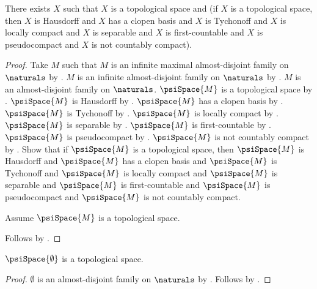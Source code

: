 \begin{theorem}\label{isbell_mrowka_example_exists}
    There exists $X$ such that $X$ is a topological space and
        (if $X$ is a topological space, then
            $X$ is Hausdorff and $X$ has a clopen basis and
            $X$ is Tychonoff and
            $X$ is locally compact and $X$ is separable and
            $X$ is first-countable and $X$ is pseudocompact and
            $X$ is not countably compact).
\end{theorem}
\begin{proof}
    Take $M$ such that
        $M$ is an infinite maximal almost-disjoint family on $\naturals$ by
        .
    $M$ is an infinite almost-disjoint family on $\naturals$ by
        .
    $M$ is an almost-disjoint family on $\naturals$.
    $\psiSpace{M}$ is a topological space by
        .
    $\psiSpace{M}$ is Hausdorff by .
    $\psiSpace{M}$ has a clopen basis by
        .
    $\psiSpace{M}$ is Tychonoff by .
    $\psiSpace{M}$ is locally compact by
        .
    $\psiSpace{M}$ is separable by .
    $\psiSpace{M}$ is first-countable by
        .
    $\psiSpace{M}$ is pseudocompact by
        .
    $\psiSpace{M}$ is not countably compact by
        .
    Show that if $\psiSpace{M}$ is a topological space, then
        $\psiSpace{M}$ is Hausdorff and
        $\psiSpace{M}$ has a clopen basis and
        $\psiSpace{M}$ is Tychonoff and
        $\psiSpace{M}$ is locally compact and
        $\psiSpace{M}$ is separable and
        $\psiSpace{M}$ is first-countable and
        $\psiSpace{M}$ is pseudocompact and
        $\psiSpace{M}$ is not countably compact.
    \begin{subproof}
        Assume $\psiSpace{M}$ is a topological space.
    \end{subproof}
    Follows by \auto.
\end{proof}

\begin{theorem}\label{empty_psi_space_is_topological_space}
    $\psiSpace{\emptyset}$ is a topological space.
\end{theorem}
\begin{proof}
    $\emptyset$ is an almost-disjoint family on $\naturals$ by
        .
    Follows by .
\end{proof}

